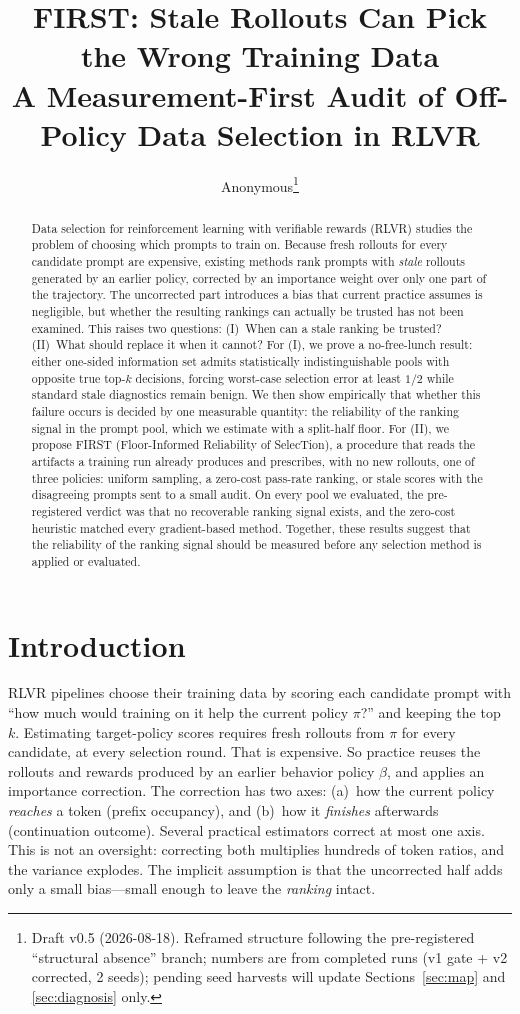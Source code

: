 \documentclass[11pt]{article}
\title{\bf FIRST: Stale Rollouts Can Pick the Wrong Training Data\\[2pt]
{\large A Measurement-First Audit of Off-Policy Data Selection in RLVR}}
\author{Anonymous\thanks{Draft v0.5 (2026-08-18). Reframed structure following the
pre-registered ``structural absence'' branch; numbers are from completed runs
(v1 gate + v2 corrected, 2 seeds); pending seed harvests will update
Sections~\ref{sec:map} and \ref{sec:diagnosis} only.}}
\date{}
\begin{document}
\maketitle

\begin{abstract}
Data selection for reinforcement learning with verifiable rewards (RLVR)
studies the problem of choosing which prompts to train on. Because fresh
rollouts for every candidate prompt are expensive, existing methods rank
prompts with \emph{stale} rollouts generated by an earlier policy, corrected
by an importance weight over only one part of the trajectory. The
uncorrected part introduces a bias that current practice assumes is
negligible, but whether the resulting rankings can actually be trusted has
not been examined. This raises two questions: (I)~When can a stale ranking be trusted? (II)~What
should replace it when it cannot? For (I), we prove a no-free-lunch result:
either one-sided information set admits statistically indistinguishable pools
with opposite true top-$k$ decisions, forcing worst-case selection error at
least $1/2$ while standard stale diagnostics remain benign. We then show empirically that whether this
failure occurs is decided by one measurable quantity: the reliability of the
ranking signal in the prompt pool, which we estimate with a split-half floor.
For (II), we propose FIRST (Floor-Informed Reliability of SelecTion), a
procedure that reads the artifacts a training run already produces and
prescribes, with no new rollouts, one of three policies: uniform sampling, a
zero-cost pass-rate ranking, or stale scores with the disagreeing prompts
sent to a small audit. On every pool we evaluated, the pre-registered verdict
was that no recoverable ranking signal exists, and the zero-cost heuristic
matched every gradient-based method. Together, these results suggest that
the reliability of the ranking signal should be measured before any
selection method is applied or evaluated.
\end{abstract}

\section{Introduction}
\label{sec:intro}

RLVR pipelines choose their training data by scoring each candidate prompt
with ``how much would training on it help the current policy $\pi$?'' and
keeping the top $k$. Estimating target-policy scores requires fresh rollouts
from $\pi$ for every
candidate, at every selection round. That is expensive. So practice reuses
the rollouts and rewards produced by an earlier behavior policy $\beta$, and
applies an importance correction. The correction has two axes: (a)~how the
current policy \emph{reaches} a token (prefix occupancy), and (b)~how it
\emph{finishes} afterwards (continuation outcome). Several practical
estimators correct at most one axis. This is not an oversight: correcting both
multiplies hundreds of token ratios, and the variance explodes. The implicit
assumption is that the uncorrected half adds only a small bias---small
enough to leave the \emph{ranking} intact.
\end{document}
